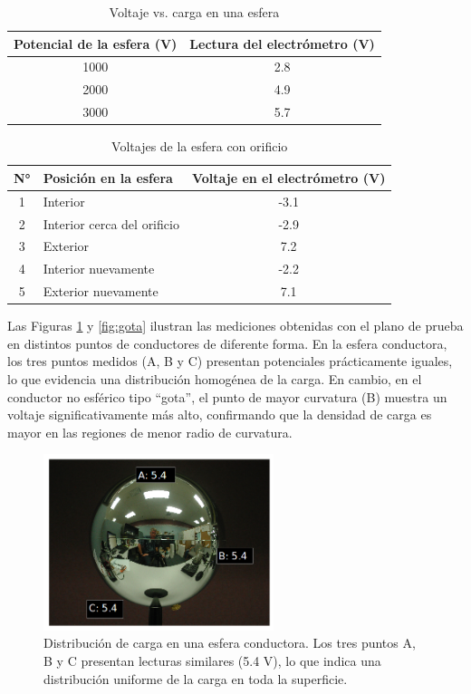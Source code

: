 \documentclass[12pt,a4paper]{article}
\begin{document}
\begin{table}[H]
\centering
\caption{Voltaje vs. carga en una esfera}
\begin{tabular}{|c|c|}
\hline
\textbf{Potencial de la esfera (V)} & \textbf{Lectura del electrómetro (V)} \\ \hline
1000 & 2.8 \\ \hline
2000 & 4.9 \\ \hline
3000 & 5.7 \\ \hline
\end{tabular}
\label{tab:voltaje_carga_esfera}
\end{table}

\begin{table}[H]
\centering
\caption{Voltajes de la esfera con orificio}
\begin{tabular}{|c|l|c|}
\hline
\textbf{N°} & \textbf{Posición en la esfera} & \textbf{Voltaje en el electrómetro (V)} \\ \hline
1 & Interior & -3.1 \\ \hline
2 & Interior cerca del orificio & -2.9 \\ \hline
3 & Exterior & 7.2 \\ \hline
4 & Interior nuevamente & -2.2 \\ \hline
5 & Exterior nuevamente & 7.1 \\ \hline
\end{tabular}
\label{tab:voltajes_esfera}
\end{table}

Las Figuras \ref{fig:esfera} y \ref{fig:gota} ilustran las mediciones obtenidas con el plano de prueba en distintos puntos de conductores de diferente forma. En la esfera conductora, los tres puntos medidos (A, B y C) presentan potenciales prácticamente iguales, lo que evidencia una distribución homogénea de la carga.  
En cambio, en el conductor no esférico tipo “gota”, el punto de mayor curvatura (B) muestra un voltaje significativamente más alto, confirmando que la densidad de carga es mayor en las regiones de menor radio de curvatura.


\begin{figure}[H]
    \centering
    \includegraphics[width=0.6\textwidth]{anexos/esferaResultados.png}
    \caption{Distribución de carga en una esfera conductora. Los tres puntos A, B y C presentan lecturas similares (5.4 V), lo que indica una distribución uniforme de la carga en toda la superficie.}
    \label{fig:esfera}
\end{figure}
\end{document}
